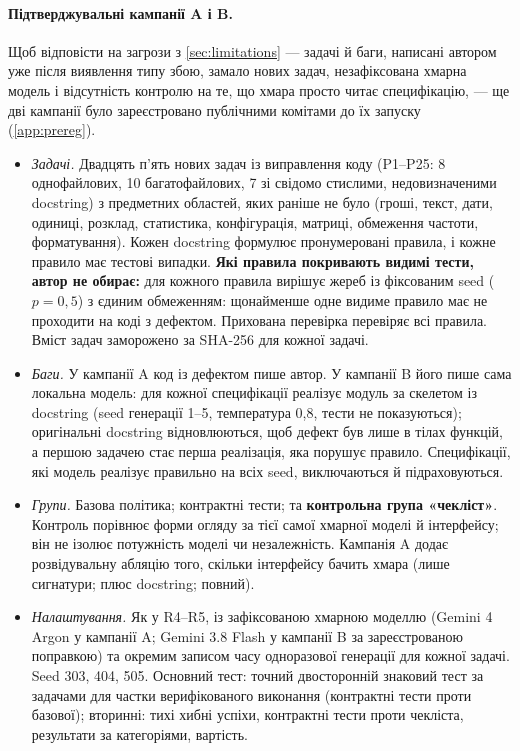\documentclass[11pt]{article}
\begin{document}
\paragraph{Підтверджувальні кампанії A і B.} Щоб відповісти на загрози з \cref{sec:limitations} --- задачі й баги, написані автором уже після виявлення типу збою, замало нових задач, незафіксована хмарна модель і відсутність контролю на те, що хмара просто читає специфікацію, --- ще дві кампанії було зареєстровано публічними комітами до їх запуску (\cref{app:prereg}).
\begin{itemize}
\item \emph{Задачі.} Двадцять п'ять нових задач із виправлення коду (P1--P25: 8 однофайлових, 10 багатофайлових, 7 зі свідомо стислими, недовизначеними docstring) з предметних областей, яких раніше не було (гроші, текст, дати, одиниці, розклад, статистика, конфігурація, матриці, обмеження частоти, форматування). Кожен docstring формулює пронумеровані правила, і кожне правило має тестові випадки. \textbf{Які правила покривають видимі тести, автор не обирає:} для кожного правила вирішує жереб із фіксованим seed ($p=0{,}5$) з єдиним обмеженням: щонайменше одне видиме правило має не проходити на коді з дефектом. Прихована перевірка перевіряє всі правила. Вміст задач заморожено за SHA-256 для кожної задачі.
\item \emph{Баги.} У кампанії A код із дефектом пише автор. У кампанії B його пише сама локальна модель: для кожної специфікації  реалізує модуль за скелетом із docstring (seed генерації 1--5, температура 0{,}8, тести не показуються); оригінальні docstring відновлюються, щоб дефект був лише в тілах функцій, а першою задачею стає перша реалізація, яка порушує правило. Специфікації, які модель реалізує правильно на всіх seed, виключаються й підраховуються.
\item \emph{Групи.} Базова політика; контрактні тести; та \textbf{контрольна група «чекліст»}. Контроль порівнює форми огляду за тієї самої хмарної моделі й інтерфейсу; він не ізолює потужність моделі чи незалежність. Кампанія A додає розвідувальну абляцію того, скільки інтерфейсу бачить хмара (лише сигнатури; плюс docstring; повний).
\item \emph{Налаштування.} Як у R4--R5, із зафіксованою хмарною моделлю (Gemini 4 Argon у кампанії A; Gemini 3.8 Flash у кампанії B за зареєстрованою поправкою) та окремим записом часу одноразової генерації для кожної задачі. Seed 303, 404, 505. Основний тест: точний двосторонній знаковий тест за задачами для частки верифікованого виконання (контрактні тести проти базової); вторинні: тихі хибні успіхи, контрактні тести проти чекліста, результати за категоріями, вартість.
\end{itemize}
\end{document}
